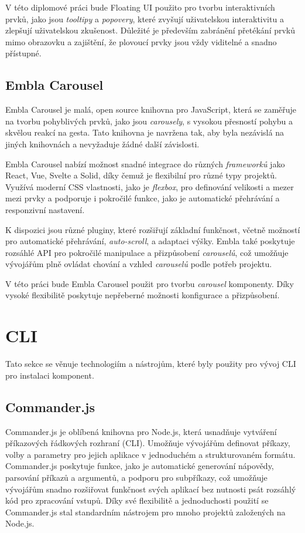 V této diplomové práci bude Floating UI použito pro tvorbu interaktivních prvků, jako jsou \emph{tooltipy} a \emph{popovery}, které zvyšují uživatelskou interaktivitu a zlepšují uživatelskou zkušenost. Důležité je především zabránění přetékání prvků mimo obrazovku a zajištění, že plovoucí prvky jsou vždy viditelné a snadno přístupné.

\subsection{Embla Carousel}
Embla Carousel je malá, open source knihovna pro JavaScript, která se zaměřuje na tvorbu pohyblivých prvků, jako jsou \emph{carousely}, s vysokou přesností pohybu a skvělou reakcí na gesta. Tato knihovna je navržena tak, aby byla nezávislá na jiných knihovnách a nevyžaduje žádné další závislosti. \cite{EmblaCarousel}

Embla Carousel nabízí možnost snadné integrace do různých \emph{frameworků} jako React, Vue, Svelte a Solid, díky čemuž je flexibilní pro různé typy projektů. Využívá moderní CSS vlastnosti, jako je \emph{flexbox}, pro definování velikosti a mezer mezi prvky a podporuje i pokročilé funkce, jako je automatické přehrávání a responzivní nastavení.

K dispozici jsou různé pluginy, které rozšiřují základní funkčnost, včetně možností pro automatické přehrávání, \emph{auto-scroll}, a adaptaci výšky. Embla také poskytuje rozsáhlé API pro pokročilé manipulace a přizpůsobení \emph{carouselů}, což umožňuje vývojářům plně ovládat chování a vzhled \emph{carouselů} podle potřeb projektu.

V této práci bude Embla Carousel použit pro tvorbu \emph{carousel} komponenty. Díky vysoké flexibilitě poskytuje nepřeberné možnosti konfigurace a přizpůsobení.

\section{CLI}
Tato sekce se věnuje technologiím a nástrojům, které byly použity pro vývoj CLI pro instalaci komponent.

\subsection{Commander.js}
Commander.js je oblíbená knihovna pro Node.js, která usnadňuje vytváření příkazových řádkových rozhraní (CLI). Umožňuje vývojářům definovat příkazy, volby a parametry pro jejich aplikace v jednoduchém a strukturovaném formátu. Commander.js poskytuje funkce, jako je automatické generování nápovědy, parsování příkazů a argumentů, a podporu pro subpříkazy, což umožňuje vývojářům snadno rozšiřovat funkčnost svých aplikací bez nutnosti psát rozsáhlý kód pro zpracování vstupů. Díky své flexibilitě a jednoduchosti použití se Commander.js stal standardním nástrojem pro mnoho projektů založených na Node.js. \cite{CommanderJS}

